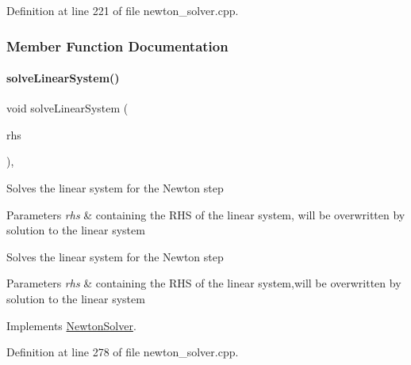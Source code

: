 Definition at line 221 of file newton\+\_\+solver.\+cpp.



\subsubsection{Member Function Documentation}
\mbox{\label{classamici_1_1_newton_solver_sparse_aa4a6695d71f00ec1b46e94b33e55660f}} 
\paragraph{\texorpdfstring{solve\+Linear\+System()}{solveLinearSystem()}}
{\footnotesize\ttfamily void solve\+Linear\+System (\begin{DoxyParamCaption}\item[{\mbox{\hyperlink{classamici_1_1_ami_vector}{Ami\+Vector}} $\ast$}]{rhs }\end{DoxyParamCaption})\hspace{0.3cm}{\ttfamily [override]}, {\ttfamily [virtual]}}

Solves the linear system for the Newton step


\begin{DoxyParams}{Parameters}
{\em rhs} & containing the R\+HS of the linear system, will be overwritten by solution to the linear system \\
\hline
\end{DoxyParams}
Solves the linear system for the Newton step


\begin{DoxyParams}{Parameters}
{\em rhs} & containing the R\+HS of the linear system,will be overwritten by solution to the linear system\\
\hline
\end{DoxyParams}


Implements \mbox{\hyperlink{classamici_1_1_newton_solver_a761a5dc9e8cc7adfd4a392421df17c3d}{Newton\+Solver}}.



Definition at line 278 of file newton\+\_\+solver.\+cpp.


